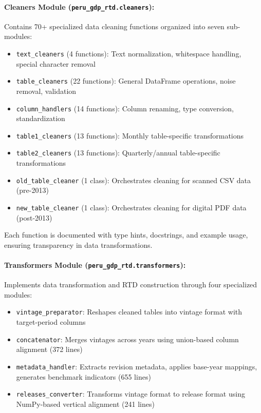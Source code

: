 \documentclass[a4paper, fleqn, 11pt]{article}
\newcommand{\pymodule}[1]{\texttt{#1}}
\begin{document}
\paragraph{Cleaners Module (\pymodule{peru\_gdp\_rtd.cleaners}):} Contains 70+ specialized data cleaning functions organized into seven sub-modules:
\begin{itemize}
    \item \pymodule{text\_cleaners} (4 functions): Text normalization, whitespace handling, special character removal
    \item \pymodule{table\_cleaners} (22 functions): General DataFrame operations, noise removal, validation
    \item \pymodule{column\_handlers} (14 functions): Column renaming, type conversion, standardization
    \item \pymodule{table1\_cleaners} (13 functions): Monthly table-specific transformations
    \item \pymodule{table2\_cleaners} (13 functions): Quarterly/annual table-specific transformations
    \item \pymodule{old\_table\_cleaner} (1 class): Orchestrates cleaning for scanned CSV data (pre-2013)
    \item \pymodule{new\_table\_cleaner} (1 class): Orchestrates cleaning for digital PDF data (post-2013)
\end{itemize}

Each function is documented with type hints, docstrings, and example usage, ensuring transparency in data transformations.

\paragraph{Transformers Module (\pymodule{peru\_gdp\_rtd.transformers}):} Implements data transformation and RTD construction through four specialized modules:
\begin{itemize}
    \item \pymodule{vintage\_preparator}: Reshapes cleaned tables into vintage format with target-period columns
    \item \pymodule{concatenator}: Merges vintages across years using union-based column alignment (372 lines)
    \item \pymodule{metadata\_handler}: Extracts revision metadata, applies base-year mappings, generates benchmark indicators (655 lines)
    \item \pymodule{releases\_converter}: Transforms vintage format to release format using NumPy-based vertical alignment (241 lines)
\end{itemize}
\end{document}
